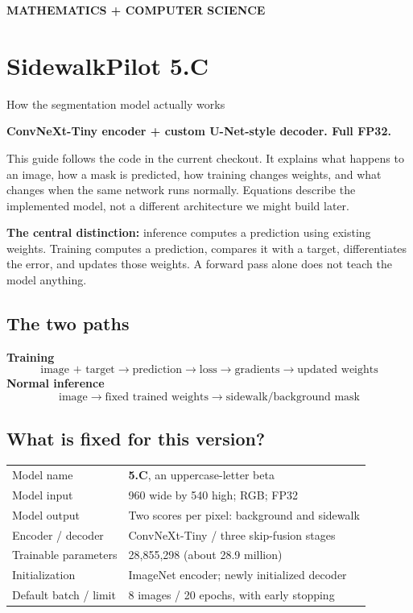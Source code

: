 \documentclass[11pt,letterpaper]{article}
\newcommand{\code}[1]{\texttt{\detokenize{#1}}}
\newcommand{\note}[1]{\par\vspace{3pt}\begingroup\setlength{\fboxsep}{8pt}%
 \colorbox{pale}{\parbox{\dimexpr\linewidth-2\fboxsep\relax}{#1}}\endgroup\par\vspace{3pt}}
\begin{document}
\setlength{\abovedisplayskip}{6pt}
\setlength{\belowdisplayskip}{6pt}
\setlength{\abovedisplayshortskip}{3pt}
\setlength{\belowdisplayshortskip}{4pt}
{\small\sffamily\bfseries\color{muted}MATHEMATICS + COMPUTER SCIENCE}
\vspace{8pt}
\section*{SidewalkPilot 5.C}
{\sffamily\large\color{blue}How the segmentation model actually works}

\textbf{ConvNeXt-Tiny encoder + custom U-Net-style decoder. Full FP32.}

This guide follows the code in the current \code{series-5} checkout. It explains what happens to an image, how a mask is predicted, how training changes weights, and what changes when the same network runs normally. Equations describe the implemented model, not a different architecture we might build later.

\note{\textbf{The central distinction:} inference computes a prediction using existing weights. Training computes a prediction, compares it with a target, differentiates the error, and updates those weights. A forward pass alone does not teach the model anything.}

\subsection*{The two paths}
\textbf{Training}
\[
\text{image + target}\to\text{prediction}\to\text{loss}\to\text{gradients}\to\text{updated weights}
\]
\textbf{Normal inference}
\[
\text{image}\to\text{fixed trained weights}\to\text{sidewalk/background mask}
\]
\subsection*{What is fixed for this version?}
\begin{tabularx}{\linewidth}{@{}lY@{}}\toprule
Model name & \textbf{5.C}, an uppercase-letter beta\\
Model input & 960 wide by 540 high; RGB; FP32\\
Model output & Two scores per pixel: background and sidewalk\\
Encoder / decoder & ConvNeXt-Tiny / three skip-fusion stages\\
Trainable parameters & 28,855,298 (about 28.9 million)\\
Initialization & ImageNet encoder; newly initialized decoder\\
Default batch / limit & 8 images / 20 epochs, with early stopping\\\bottomrule
\end{tabularx}
\end{document}
